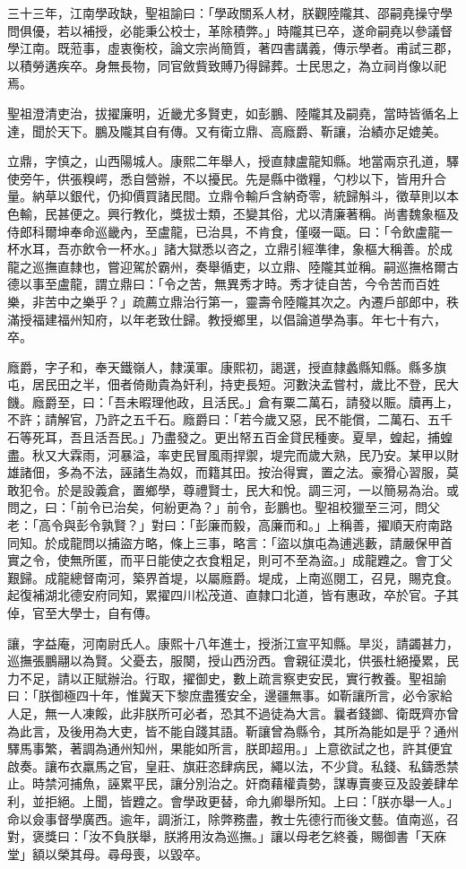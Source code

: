 \begin{pinyinscope}
三十三年，江南學政缺，聖祖諭曰：「學政關系人材，朕觀陸隴其、邵嗣堯操守學問俱優，若以補授，必能秉公校士，革除積弊。」時隴其已卒，遂命嗣堯以參議督學江南。既蒞事，虛衷衡校，論文宗尚簡質，著四書講義，傳示學者。甫試三郡，以積勞遘疾卒。身無長物，同官斂貲致賻乃得歸葬。士民思之，為立祠肖像以祀焉。

聖祖澄清吏治，拔擢廉明，近畿尤多賢吏，如彭鵬、陸隴其及嗣堯，當時皆循名上達，聞於天下。鵬及隴其自有傳。又有衛立鼎、高廕爵、靳讓，治績亦足媲美。

立鼎，字慎之，山西陽城人。康熙二年舉人，授直隸盧龍知縣。地當兩京孔道，驛使旁午，供張糗崿，悉自營辦，不以擾民。先是縣中徵糧，勺杪以下，皆用升合量。納草以銀代，仍抑價買諸民間。立鼎令輸戶含納奇零，統歸斛斗，徵草則以本色輸，民甚便之。興行教化，獎拔士類，丕變其俗，尤以清廉著稱。尚書魏象樞及侍郎科爾坤奉命巡畿內，至盧龍，已治具，不肯食，僅啜一甌。曰：「令飲盧龍一杯水耳，吾亦飲令一杯水。」諸大獄悉以咨之，立鼎引經準律，象樞大稱善。於成龍之巡撫直隸也，嘗迎駕於霸州，奏舉循吏，以立鼎、陸隴其並稱。嗣巡撫格爾古德以事至盧龍，謂立鼎曰：「令之苦，無異秀才時。秀才徒自苦，今令苦而百姓樂，非苦中之樂乎？」疏薦立鼎治行第一，靈壽令陸隴其次之。內遷戶部郎中，秩滿授福建福州知府，以年老致仕歸。教授鄉里，以倡論道學為事。年七十有六，卒。

廕爵，字子和，奉天鐵嶺人，隸漢軍。康熙初，謁選，授直隸蠡縣知縣。縣多旗屯，居民田之半，佃者倚勛貴為奸利，持吏長短。河數決孟嘗村，歲比不登，民大饑。廕爵至，曰：「吾未暇理他政，且活民。」倉有粟二萬石，請發以賑。牘再上，不許；請解官，乃許之五千石。廕爵曰：「若今歲又惡，民不能償，二萬石、五千石等死耳，吾且活吾民。」乃盡發之。更出帑五百金貸民種麥。夏旱，蝗起，捕蝗盡。秋又大霖雨，河暴溢，率吏民冒風雨捍禦，堤完而歲大熟，民乃安。某甲以財雄諸佃，多為不法，誣諸生為奴，而籍其田。按治得實，置之法。豪猾心習服，莫敢犯令。於是設義倉，置鄉學，尊禮賢士，民大和悅。調三河，一以簡易為治。或問之，曰：「前令已治矣，何紛更為？」前令，彭鵬也。聖祖校獵至三河，問父老：「高令與彭令孰賢？」對曰：「彭廉而毅，高廉而和。」上稱善，擢順天府南路同知。於成龍問以捕盜方略，條上三事，略言：「盜以旗屯為逋逃藪，請嚴保甲首實之令，使無所匿，而平日能使之衣食粗足，則可不至為盜。」成龍韙之。會丁父艱歸。成龍總督南河，築界首堤，以屬廕爵。堤成，上南巡閱工，召見，賜克食。起復補湖北德安府同知，累擢四川松茂道、直隸口北道，皆有惠政，卒於官。子其倬，官至大學士，自有傳。

讓，字益庵，河南尉氏人。康熙十八年進士，授浙江宣平知縣。旱災，請蠲甚力，巡撫張鵬翮以為賢。父憂去，服闋，授山西汾西。會親征漠北，供張杜絕擾累，民力不足，請以正賦辦治。行取，擢御史，數上疏言察吏安民，實行教養。聖祖諭曰：「朕御極四十年，惟冀天下黎庶盡獲安全，邊疆無事。如靳讓所言，必令家給人足，無一人凍餒，此非朕所可必者，恐其不過徒為大言。曩者錢鎯、衛既齊亦曾為此言，及後用為大吏，皆不能自踐其語。靳讓曾為縣令，其所為能如是乎？通州驛馬事繁，著調為通州知州，果能如所言，朕即超用。」上意欲試之也，許其便宜啟奏。讓布衣羸馬之官，皇莊、旗莊恣肆病民，繩以法，不少貸。私錢、私鑄悉禁止。時禁河捕魚，誣累平民，讓分別治之。奸商藉權貴勢，謀專賣麥豆及設姜肆牟利，並拒絕。上聞，皆韙之。會學政更替，命九卿舉所知。上曰：「朕亦舉一人。」命以僉事督學廣西。逾年，調浙江，除弊務盡，教士先德行而後文藝。值南巡，召對，褒獎曰：「汝不負朕舉，朕將用汝為巡撫。」讓以母老乞終養，賜御書「天庥堂」額以榮其母。尋母喪，以毀卒。


\end{pinyinscope}

